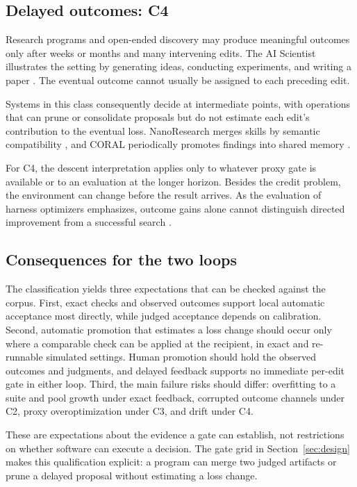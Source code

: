 \documentclass[
  11pt,
]{article}
\begin{document}
\subsection{Delayed outcomes: C4}\label{delayed-outcomes-c4}

Research programs and open-ended discovery may produce meaningful outcomes only after weeks or months and many intervening edits. The AI Scientist illustrates the setting by generating ideas, conducting experiments, and writing a paper \cite{lu2024aiscientist}. The eventual outcome cannot usually be assigned to each preceding edit.

Systems in this class consequently decide at intermediate points, with operations that can prune or consolidate proposals but do not estimate each edit's contribution to the eventual loss. NanoResearch merges skills by semantic compatibility \cite{xu2026nanoresearch}, and CORAL periodically promotes findings into shared memory \cite{qu2026coral}.

For C4, the descent interpretation applies only to whatever proxy gate is available or to an evaluation at the longer horizon. Besides the credit problem, the environment can change before the result arrives. As the evaluation of harness optimizers emphasizes, outcome gains alone cannot distinguish directed improvement from a successful search \cite{ong2026harnesseval}.

\subsection{Consequences for the two loops}\label{consequences-for-the-two-loops}

The classification yields three expectations that can be checked against the corpus. First, exact checks and observed outcomes support local automatic acceptance most directly, while judged acceptance depends on calibration. Second, automatic promotion that estimates a loss change should occur only where a comparable check can be applied at the recipient, in exact and re-runnable simulated settings. Human promotion should hold the observed outcomes and judgments, and delayed feedback supports no immediate per-edit gate in either loop. Third, the main failure risks should differ: overfitting to a suite and pool growth under exact feedback, corrupted outcome channels under C2, proxy overoptimization under C3, and drift under C4.

These are expectations about the evidence a gate can establish, not restrictions on whether software can execute a decision. The gate grid in Section~\ref{sec:design} makes this qualification explicit: a program can merge two judged artifacts or prune a delayed proposal without estimating a loss change.
\end{document}

